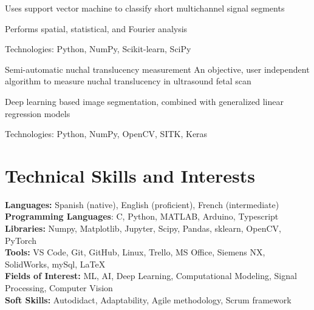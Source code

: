 \documentclass{resume}
\begin{document}
    \resumeItemListStart
    \item {Uses support vector machine to classify short multichannel signal segments}
    \item {Performs spatial, statistical, and Fourier analysis}
    \item {Technologies: Python, NumPy, Scikit-learn, SciPy}
    \resumeItemListEnd

    \resumeProject
    {Semi-automatic nuchal translucency measurement} %
    {An objective, user independent algorithm to measure nuchal translucency in ultrasound fetal scan}
    {} %

    \resumeItemListStart
    \item {Deep learning based image segmentation, combined with generalized linear regression models}
    \item {Technologies: Python, NumPy, OpenCV, SITK, Keras}
    \resumeItemListEnd

    \resumeSubHeadingListEnd


    \vspace{-5mm}


    \section{\textbf{Technical Skills and Interests}} \label{sec:skills}
    \begin{itemize}[leftmargin=0.05in, label={}]
        \small{\item{
            \textbf{Languages:}{ Spanish (native), English (proficient), French (intermediate) } \\
            \textbf{Programming Languages}{: C, Python, MATLAB, Arduino, Typescript } \\
            \textbf{Libraries:}{ Numpy, Matplotlib, Jupyter, Scipy, Pandas, sklearn, OpenCV, PyTorch}\\
            \textbf{Tools:}{ VS Code, Git, GitHub, Linux, Trello, MS Office, Siemens NX, SolidWorks, mySql,
                \LaTeX} \\
            \textbf{Fields of Interest:}
            {ML, AI, Deep Learning, Computational Modeling, Signal Processing, Computer Vision} \\
            \textbf{Soft Skills:}{ Autodidact, Adaptability, Agile methodology, Scrum framework} \\
        }}
    \end{itemize}
\end{document}
